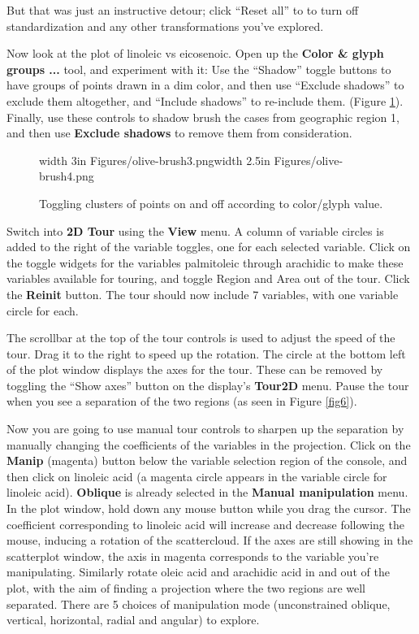 \documentclass[11pt]{article}
\def\Widget#1{\textbf{#1}}
\begin{document}
But that was just an instructive detour; click ``Reset all'' to
to turn off standardization and any other transformations you've
explored.

Now look at the plot of linoleic vs eicosenoic. Open up the
\Widget{Color \& glyph groups ...} tool, and experiment with it: Use
the ``Shadow'' toggle buttons to have groups of points drawn in a dim
color, and then use ``Exclude shadows'' to exclude them altogether,
and ``Include shadows'' to re-include them.  (Figure \ref{fig5}).
Finally, use these controls to shadow brush the cases from geographic
region 1, and then use \Widget{Exclude shadows} to remove them from
consideration.

\begin{figure}[htp]
\centerline{\pdfimage width 3in {Figures/olive-brush3.png}\hspace{0.2in}\pdfimage width 2.5in {Figures/olive-brush4.png}}
\caption{Toggling clusters of points on and off according to color/glyph value.}
\label{fig5}
\end{figure}

Switch into \Widget{2D Tour} using the \Widget{View} menu. A column of
variable circles is added to the right of the variable toggles, one
for each selected variable.  Click on the toggle widgets for the
variables palmitoleic through arachidic to make these variables
available for touring, and toggle Region and Area out of the tour.
Click the \Widget{Reinit} button.  The tour should now include 7
variables, with one variable circle for each.

The scrollbar at the top of the tour controls is used to adjust the
speed of the tour.  Drag it to the right to speed up the rotation.
The circle at the bottom left of the plot window displays the axes for
the tour. These can be removed by toggling the ``Show axes'' button on
the display's \Widget{Tour2D} menu.  Pause the tour when you see a
separation of the two regions (as seen in Figure \ref{fig6}).

Now you are going to use manual tour controls to sharpen up the
separation by manually changing the coefficients of the variables in
the projection.  Click on the \Widget{Manip} (magenta) button below
the variable selection region of the console, and then click on
linoleic acid (a magenta circle appears in the variable circle for
linoleic acid).  \Widget{Oblique} is already selected in the
\Widget{Manual manipulation} menu.  In the plot window, hold down any
mouse button while you drag the cursor. The coefficient corresponding
to linoleic acid will increase and decrease following the mouse,
inducing a rotation of the scattercloud.  If the axes are still
showing in the scatterplot window, the axis in magenta corresponds to
the variable you're manipulating.  Similarly rotate oleic acid and
arachidic acid in and out of the plot, with the aim of finding a
projection where the two regions are well separated.  There are 5
choices of manipulation mode (unconstrained oblique, vertical,
horizontal, radial and angular) to explore.
\end{document}
